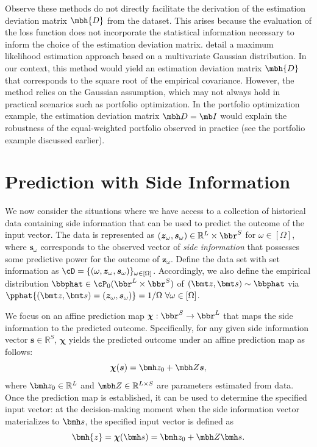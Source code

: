 \documentclass[mnsc, nonblindrev]{informswp}
\newcommand{\1}[1]{\mathds{1}{\left(#1\right)}}
\begin{document}
Observe these methods do not directly facilitate the derivation of the estimation deviation matrix $\mbh{D}$ from the dataset. This arises because the evaluation of the loss function does not incorporate the statistical information necessary to inform the choice of the estimation deviation matrix. \cite{Zhu_Xie_Sim_2021joint} detail a maximum likelihood estimation approach based on a multivariate Gaussian distribution. In our context, this method would yield an estimation deviation matrix $\mbh{D}$ that corresponds to the square root of the empirical covariance. However, the method relies on the Gaussian assumption, which may not always hold in practical scenarios such as portfolio optimization. In the portfolio optimization example, the estimation deviation matrix $\mbh D = \mb I$ would explain the robustness of the equal-weighted portfolio observed in practice (see the portfolio example discussed earlier).

\section{Prediction with Side Information}
\label{sec:prediction_with_side_info}

We now consider the situations where we have access to a collection of historical data containing side information that can be used to predict the outcome of the input vector. The data is represented as $(\bm{z}_\omega, \bm s_\omega) \in \mathbb{R}^L \times \bbr^S$ for $\omega \in [\Omega]$, where $\bm{s}_\omega$ corresponds to the observed vector of \textit{side information} that possesses some predictive power for the outcome of $\bm z_\omega$. Define the data set with set information as $\cD = \{(\omega,\bm z_\omega,\bm s_\omega)\}_{\omega  \in [\Omega]}$. Accordingly, we also define the empirical distribution $\bbphat \in \cP_0(\bbr^L\times \bbr^S )$ of $(\bmt z,\bmt s) \sim \bbphat$ via $\pphat{(\bmt z,\bmt s) = (\bm z_\omega,\bm s_\omega) } = 1/\Omega ~\forall \omega  \in [\Omega]$. 

We focus on an affine prediction map $\bm \chi:\bbr^S\rightarrow \bbr^L$ that maps the side information to the predicted outcome. Specifically, for any given side information vector $\bm s \in \mathbb{R}^S$, $\bm \chi$ yields the predicted outcome under an affine prediction map as follows:
$$
\bm \chi(\bm s) = \bmh z_0 + \mbh Z \bm s,
$$ 
where $\bmh z_0 \in \mathbb{R}^{L}$ and $\mbh Z \in \mathbb{R}^{L\times S}$ are parameters estimated from data. Once the prediction map is established, it can be used to determine the specified input vector: at the decision-making moment when the side information vector materializes to $\bmh s$, the specified input vector is defined as 
$$
\bmh{z} = \bm \chi(\bmh s) = \bmh z_0 + \mbh Z \bmh s.
$$
\end{document}
